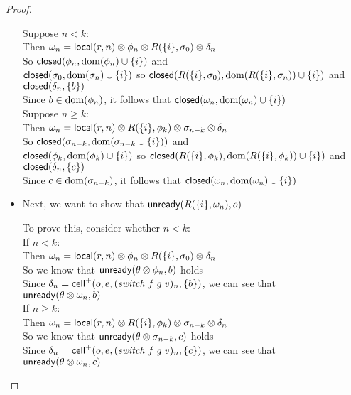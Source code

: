 \begin{proof}
\begin{itemize}
  \begin{tabbedproof}
    \oo Suppose $n < k$:\\
    \ooo Then $\omega_n = \mathsf{local}({r}, {n}) \otimes \phi_n \otimes R(\{{i}\}, \sigma_0) \otimes \delta_n$ \\
    \ooo So $\mathsf{closed}({\phi_n}, {\mbox{dom}({\phi_n}) \cup \{{i}\}})$ and \\
    \ooox $\mathsf{closed}({\sigma_0}, {\mbox{dom}({\sigma_n}) \cup \{{i}\}})$ so $\mathsf{closed}({R(\{{i}\}, \sigma_0)}, {\mbox{dom}({R(\{{i}\}, \sigma_n)}) \cup \{{i}\}})$ and \\
    \ooox $\mathsf{closed}({\delta_n}, {\{{b}\}})$ \\
    \ooo Since $b \in \mbox{dom}({\phi_n})$, it follows that $\mathsf{closed}({\omega_n}, {\mbox{dom}({\omega_n}) \cup \{{i}\}})$ \\
    \oo Suppose $n \geq k$:\\
    \ooo Then $\omega_n = \mathsf{local}({r}, {n}) \otimes R(\{{i}\}, \phi_k) \otimes \sigma_{n-k} \otimes \delta_n$ \\
    \ooo So $\mathsf{closed}({\sigma_{n-k}}, {\mbox{dom}({\sigma_{n-k} \cup \{{i}\}})})$ and \\
    \ooox $\mathsf{closed}({\phi_k}, {\mbox{dom}({\phi_k}) \cup \{{i}\}})$ so $\mathsf{closed}({R(\{{i}\}, \phi_k)}, {\mbox{dom}({R(\{{i}\}, \phi_k)}) \cup \{{i}\}})$ and \\
    \ooox $\mathsf{closed}({\delta_n}, {\{{c}\}})$ \\
    \ooo Since $c \in \mbox{dom}({\sigma_{n-k}})$, it follows that $\mathsf{closed}({\omega_n}, {\mbox{dom}({\omega_n}) \cup \{{i}\}})$  \end{tabbedproof}

\item Next, we want to show that $\mathsf{unready}({R(\{{i}\}, \omega_n)}, {o})$

  \begin{tabbedproof}
    \oo To prove this, consider whether $n < k$:\\
    \oo If $n < k$:\\
    \ooo Then $\omega_n = \mathsf{local}({r}, {n}) \otimes \phi_n \otimes R(\{{i}\}, \sigma_0) \otimes \delta_n$ \\
    \ooo So we know that $\mathsf{unready}({\theta \otimes \phi_n}, {b})$ holds \\
    \ooo Since $\delta_n = \mathsf{cell}^{+}({o}, {e}, {(\mathit{switch}\;f\;g\;v)_n}, {\{{b}\}})$, we can see that \\
    \ooo $\mathsf{unready}({\theta \otimes \omega_n}, {b})$ \\
    \oo If $n \geq k$: \\
    \ooo Then $\omega_n = \mathsf{local}({r}, {n}) \otimes R(\{{i}\}, \phi_k) \otimes \sigma_{n-k} \otimes \delta_n$ \\
    \ooo So we know that $\mathsf{unready}({\theta \otimes \sigma_{n-k}}, {c})$ holds \\
    \ooo Since $\delta_n = \mathsf{cell}^{+}({o}, {e}, {(\mathit{switch}\;f\;g\;v)_n}, {\{{c}\}})$, we can see that \\
    \ooo $\mathsf{unready}({\theta \otimes \omega_n}, {c})$ \\
  \end{tabbedproof}



\end{itemize}
\end{proof}
